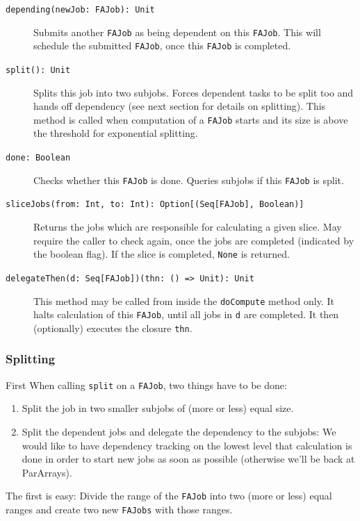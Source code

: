 \documentclass[runningheads,a4paper,fleqn]{llncs}
\begin{document}
\begin{description}
  \item[\texttt{depending(newJob: FAJob): Unit}] Submits another \texttt{FAJob} as being
    dependent on this \texttt{FAJob}. This will schedule the submitted
    \texttt{FAJob}, once this \texttt{FAJob} is completed.
  \item[\texttt{split(): Unit}] Splits this job into two
    subjobs. Forces dependent tasks to be split too and hands off
    dependency (see next section for details on splitting). This
    method is called when computation of a \texttt{FAJob} starts and
    its size is above the threshold for exponential splitting.
  \item[\texttt{done: Boolean}] Checks whether this \texttt{FAJob} is
    done. Queries subjobs if this \texttt{FAJob} is split.
  \item[\texttt{sliceJobs(from: Int, to: Int): Option[(Seq[FAJob],
      Boolean)]}] Returns the jobs which are responsible for
    calculating a given slice. May require the caller to check again,
    once the jobs are completed (indicated by the boolean flag). If
    the slice is completed, \texttt{None} is returned.
  \item[\texttt{delegateThen(d: Seq[FAJob])(thn: () => Unit): Unit}]
    This method may be called from inside the \texttt{doCompute}
    method only. It halts calculation of this \texttt{FAJob}, until
    all jobs in \texttt{d} are completed. It then (optionally)
    executes the closure \texttt{thn}.
\end{description}

\subsubsection{Splitting}
First
When calling \texttt{split} on a \texttt{FAJob}, two things have to be
done:
\begin{enumerate}
\item Split the job in two smaller subjobs of (more or less) equal
  size.
\item Split the dependent jobs and delegate the dependency to the
  subjobs: We would like to have dependency tracking on the lowest
  level that calculation is done in order to start new jobs as soon as
  possible (otherwise we'll be back at ParArrays).
\end{enumerate}

The first is easy: Divide the range of the \texttt{FAJob} into two
(more or less) equal ranges and create two new \texttt{FAJobs} with
those ranges.
\end{document}
